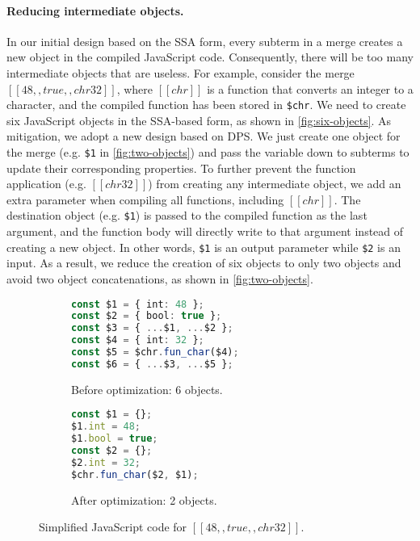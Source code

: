 \paragraph{Reducing intermediate objects.}
In our initial design based on the SSA form, every subterm in a merge creates a
new object in the compiled JavaScript code. Consequently, there will be too many
intermediate objects that are useless. For example, consider the merge
$[[48 ,, true ,, chr 32]]$, where $[[chr]]$ is a function that converts an
integer to a character, and the compiled function has been stored in
\lstinline{$chr}. We need to create six JavaScript objects in the SSA-based
form, as shown in \autoref{fig:six-objects}. As mitigation, we adopt a new
design based on DPS. We just create one object for the merge (e.g.
\lstinline{$1} in \autoref{fig:two-objects}) and pass the variable down to
subterms to update their corresponding properties. To further prevent the
function application (e.g. $[[chr 32]]$) from creating any intermediate object,
we add an extra parameter when compiling all functions, including $[[chr]]$. The
destination object (e.g. \lstinline{$1}) is passed to the compiled function as
the last argument, and the function body will directly write to that argument
instead of creating a new object. In other words, \lstinline{$1} is an output
parameter while \lstinline{$2} is an input. As a result, we reduce the creation
of six objects to only two objects and avoid two object concatenations, as shown
in \autoref{fig:two-objects}.

\begin{figure}
\centering
\begin{subfigure}{.37\textwidth}
\begin{lstlisting}[language=TypeScript]
const $1 = { int: 48 };
const $2 = { bool: true };
const $3 = { ...$1, ...$2 };
const $4 = { int: 32 };
const $5 = $chr.fun_char($4);
const $6 = { ...$3, ...$5 };
\end{lstlisting}
\caption{Before optimization: 6 objects.} \label{fig:six-objects}
\end{subfigure}%
\hspace{.1\textwidth}%
\begin{subfigure}{.33\textwidth}
\begin{lstlisting}[language=TypeScript]
const $1 = {};
$1.int = 48;
$1.bool = true;
const $2 = {};
$2.int = 32;
$chr.fun_char($2, $1);
\end{lstlisting}
\caption{After optimization: 2 objects.} \label{fig:two-objects}
\end{subfigure}
\caption{Simplified JavaScript code for $[[48 ,, true ,, chr 32]]$.}
\end{figure}


